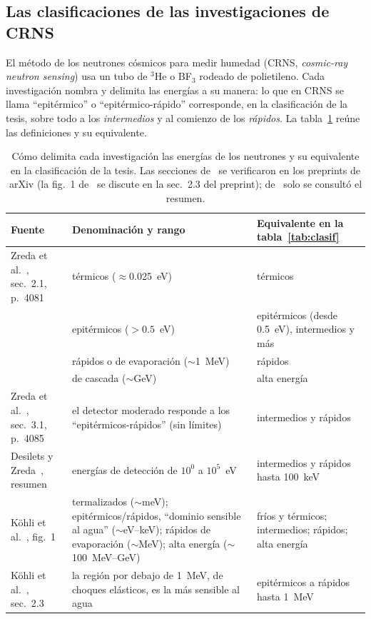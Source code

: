 \documentclass[11pt,a4paper]{article}
\begin{document}
\subsection{Las clasificaciones de las investigaciones de CRNS}\label{sec:rango}
El método de los neutrones cósmicos para medir humedad (CRNS, \emph{cosmic-ray neutron sensing}) usa un tubo de
$^3$He o BF$_3$ rodeado de polietileno. Cada investigación nombra y delimita las energías a su manera: lo que en CRNS
se llama ``epitérmico'' o ``epitérmico-rápido'' corresponde, en la clasificación de la tesis, sobre todo a los
\emph{intermedios} y al comienzo de los \emph{rápidos}. La tabla~\ref{tab:corresp} reúne las definiciones y su
equivalente.

\begin{table}[H]
	\centering
	\footnotesize\setlength\tabcolsep{4pt}
	\caption{Cómo delimita cada investigación las energías de los neutrones y su equivalente en la clasificación de la
		tesis. Las secciones de~\cite{Kohli2015,Kohli2018} se verificaron en los preprints de arXiv (la fig.~1
		de~\cite{Kohli2015} se discute en la sec.~2.3 del preprint); de~\cite{Desilets2013} solo se consultó el resumen.}\label{tab:corresp}
\begin{tabular}{p{3.6cm}p{5.6cm}p{5.4cm}}
\toprule
Fuente & Denominación y rango & Equivalente en la tabla~\ref{tab:clasif} \\
\midrule
Zreda et al.~\cite{Zreda2012}, sec.~2.1, p.~4081 & térmicos ($\approx$0.025~eV) & térmicos \\
 & epitérmicos ($>0.5$~eV) & epitérmicos (desde 0.5~eV), intermedios y más \\
 & rápidos o de evaporación ($\sim$1~MeV) & rápidos \\
 & de cascada ($\sim$GeV) & alta energía \\
Zreda et al.~\cite{Zreda2012}, sec.~3.1, p.~4085 & el detector moderado responde a los ``epitérmicos-rápidos'' (sin límites) & intermedios y rápidos \\
\midrule
Desilets y Zreda~\cite{Desilets2013}, resumen & energías de detección de $10^0$ a $10^5$~eV & intermedios y rápidos hasta 100~keV \\
\midrule
Köhli et al.~\cite{Kohli2015}, fig.~1 & termalizados ($\sim$meV); epitérmicos/rápidos, ``dominio sensible al agua'' ($\sim$eV--keV); rápidos de evaporación ($\sim$MeV); alta energía ($\sim$100~MeV--GeV) & fríos y térmicos; intermedios; rápidos; alta energía \\
Köhli et al.~\cite{Kohli2015}, sec.~2.3 & la región por debajo de 1~MeV, de choques elásticos, es la más sensible al agua & epitérmicos a rápidos hasta 1~MeV \\

\end{tabular}
\end{table}
\end{document}
